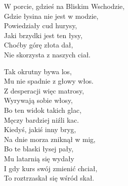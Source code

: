 \vspace{1em}
W porcie, gdzieś na Bliskim Wschodzie, \\
Gdzie łysina nie jest w modzie, \\
Powiedziały cud hurysy, \\
Jaki brzydki jest ten łysy, \\
Choćby górę złota dał, \\
Nie skorzysta z naszych ciał. \\
\newpage

Tak okrutny bywa los, \\
Mu nie spadnie z głowy włos. \\
Z desperacji więc matrosy, \\
Wyrywają sobie włosy, \\
Bo ten widok takich glac, \\
Męczy bardziej niźli kac. \\

Kiedyś, jakiś inny bryg, \\
Na dnie morza zniknął w mig, \\
Bo te blaski łysej pały, \\
Mu latarnią się wydały \\
I gdy kurs swój zmienić chciał, \\
To roztrzaskał się wśród skał. \\
